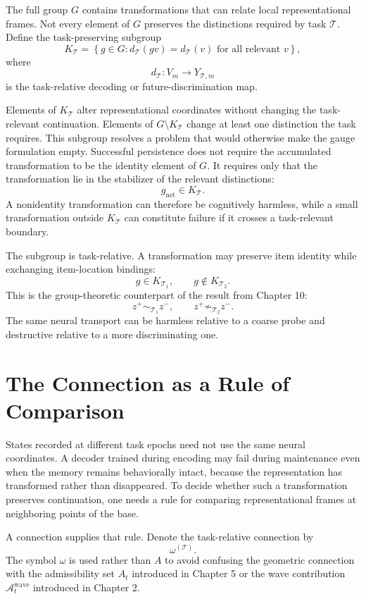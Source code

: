 \documentclass[11pt]{book}
\begin{document}
The full group $G$ contains transformations that can relate local representational frames. Not every element of $G$ preserves the distinctions required by task $\mathcal T$. Define the task-preserving subgroup
\[
K_{\mathcal T}
=
\left\{
g\in G:
d_{\mathcal T}(gv)=d_{\mathcal T}(v)
\text{ for all relevant }v
\right\},
\]
where
\[
d_{\mathcal T}:V_m\longrightarrow Y_{\mathcal T,m}
\]
is the task-relative decoding or future-discrimination map.

Elements of $K_{\mathcal T}$ alter representational coordinates without changing the task-relevant continuation. Elements of $G\setminus K_{\mathcal T}$ change at least one distinction the task requires. This subgroup resolves a problem that would otherwise make the gauge formulation empty. Successful persistence does not require the accumulated transformation to be the identity element of $G$. It requires only that the transformation lie in the stabilizer of the relevant distinctions:
\[
g_{\mathrm{net}}\in K_{\mathcal T}.
\]
A nonidentity transformation can therefore be cognitively harmless, while a small transformation outside $K_{\mathcal T}$ can constitute failure if it crosses a task-relevant boundary.

The subgroup is task-relative. A transformation may preserve item identity while exchanging item-location bindings:
\[
g\in K_{\mathcal T_1},
\qquad
g\notin K_{\mathcal T_2}.
\]
This is the group-theoretic counterpart of the result from Chapter 10:
\[
z^{+}\sim_{\mathcal T_1}z^{-},
\qquad
z^{+}\not\sim_{\mathcal T_2}z^{-}.
\]
The same neural transport can be harmless relative to a coarse probe and destructive relative to a more discriminating one.

\section*{The Connection as a Rule of Comparison}

States recorded at different task epochs need not use the same neural coordinates. A decoder trained during encoding may fail during maintenance even when the memory remains behaviorally intact, because the representation has transformed rather than disappeared. To decide whether such a transformation preserves continuation, one needs a rule for comparing representational frames at neighboring points of the base.

A connection supplies that rule. Denote the task-relative connection by
\[
\omega^{(\mathcal T)}.
\]
The symbol $\omega$ is used rather than $A$ to avoid confusing the geometric connection with the admissibility set $A_t$ introduced in Chapter 5 or the wave contribution $\mathcal A_t^{\mathrm{wave}}$ introduced in Chapter 2.
\end{document}
